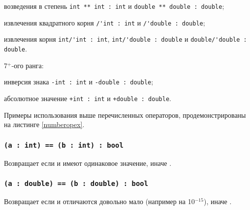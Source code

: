 \begin{icItems}
\begin{icItems}
				возведения в степень \lstinline`int ** int : int` и \lstinline`double ** double : double`;
			\item
				извлечения квадратного корня \lstinline`/'int : int` и \lstinline`/'double : double`;
			\item
				извлечения корня \lstinline`int/'int : int`, \lstinline|int/'double : double| и \lstinline`double/'double : double`.
		\end{icItems}
	\item
		7$^+$-ого ранга:
		\begin{icItems}
			\item
				инверсия знака \lstinline`-int : int` и \lstinline`-double : double`;
			\item
				абсолютное значение \lstinline`+int : int` и \lstinline`+double : double`.
		\end{icItems}
\end{icItems}

Примеры использования выше перечисленных операторов, продемонстрированы на листинге \ref{numberopex}.

\subsubsection{\lstinline`(a : int) == (b : int) : bool`}

Возвращает \true{} если  и  имеют одинаковое значение, иначе \false{}.

\subsubsection{\lstinline`(a : double) == (b : double) : bool`}

Возвращает \true{} если  и  отличаются довольно мало (например на 10$^{-15}$), иначе \false{}.

